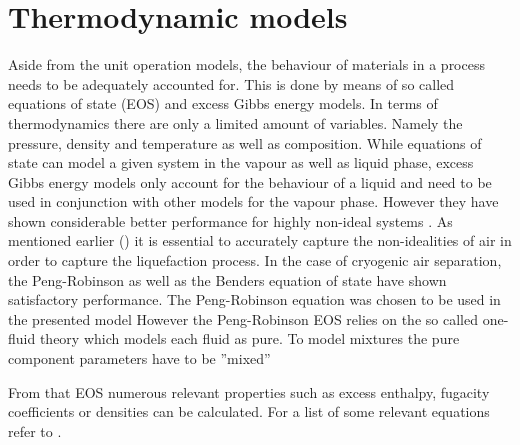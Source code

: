 \section{Thermodynamic models}
\label{sec:peng-rob}
    Aside from the unit operation models, the behaviour of materials in a process needs to be adequately 
    accounted for. This is done by means of so called equations of state (EOS) and excess Gibbs energy 
    models. In terms of thermodynamics there are only a limited amount of variables. Namely the pressure, 
    density and temperature as well as composition. While equations of state can model a given system in 
    the vapour as well as liquid phase, excess Gibbs energy models only account for the behaviour of a liquid 
    and need to be used in conjunction with other models for the vapour phase. However they have shown 
    considerable better performance for highly non-ideal systems \cite{AndreasPfennig.2003}. As mentioned 
    earlier () it is essential to accurately capture the non-idealities of air 
    in order to capture the liquefaction process. In the case of cryogenic air separation, the Peng-Robinson
    as well as the Benders equation of state have shown satisfactory performance. The Peng-Robinson equation 
    was chosen to be used in the presented model
    However the Peng-Robinson EOS relies on the so called one-fluid theory which models each fluid as pure. 
    To model mixtures the pure component parameters have to be ''mixed''
    
    From that EOS numerous relevant properties such as excess enthalpy, fugacity coefficients or densities 
    can be calculated. For a list of some relevant equations refer to .
	
